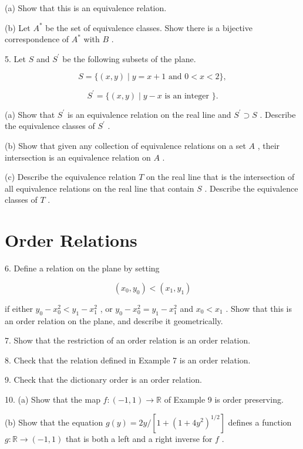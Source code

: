 (a) Show that this is an equivalence relation.

(b) Let \({A}^{ * }\) be the set of equivalence classes. Show there is a bijective correspondence of \({A}^{ * }\) with \(B\) .

5. Let \(S\) and \({S}^{\prime }\) be the following subsets of the plane.

\[
S = \{ \left( {x,y}\right)  \mid  y = x + 1\text{ and }0 < x < 2\} ,
\]

\[
{S}^{\prime } = \{ \left( {x,y}\right)  \mid  y - x\text{ is an integer }\} .
\]

(a) Show that \({S}^{\prime }\) is an equivalence relation on the real line and \({S}^{\prime } \supset  S\) . Describe the equivalence classes of \({S}^{\prime }\) .

(b) Show that given any collection of equivalence relations on a set \(A\) , their intersection is an equivalence relation on \(A\) .

(c) Describe the equivalence relation \(T\) on the real line that is the intersection of all equivalence relations on the real line that contain \(S\) . Describe the equivalence classes of \(T\) .

\section*{Order Relations}

6. Define a relation on the plane by setting

\[
\left( {{x}_{0},{y}_{0}}\right)  < \left( {{x}_{1},{y}_{1}}\right)
\]

if either \({y}_{0} - {x}_{0}^{2} < {y}_{1} - {x}_{1}^{2}\) , or \({y}_{0} - {x}_{0}^{2} = {y}_{1} - {x}_{1}^{2}\) and \({x}_{0} < {x}_{1}\) . Show that this is an order relation on the plane, and describe it geometrically.

7. Show that the restriction of an order relation is an order relation.

8. Check that the relation defined in Example 7 is an order relation.

9. Check that the dictionary order is an order relation.

10. (a) Show that the map \(f : \left( {-1,1}\right)  \rightarrow  \mathbb{R}\) of Example 9 is order preserving.

(b) Show that the equation \(g\left( y\right)  = {2y}/\left\lbrack  {1 + {\left( 1 + 4{y}^{2}\right) }^{1/2}}\right\rbrack\) defines a function \(g : \mathbb{R} \rightarrow  \left( {-1,1}\right)\) that is both a left and a right inverse for \(f\) .

